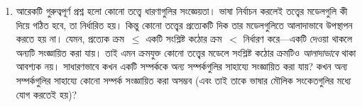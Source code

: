 \documentclass[../../../include/open-logic-section]{subfiles}
\begin{document}
\begin{explain}
\begin{enumerate}
  স্বতঃসিদ্ধ অন্যগুলির ফলশ্রুতি হয়ে অপ্রয়োজনীয় হতে পারে।
  $\Gamma$-র স্বতঃসিদ্ধ~$!A$ যে অপ্রয়োজনীয়, তা
  $\Gamma \setminus \{!A\} \Entails !A$ প্রমাণ করে দেখাতে পারি। আবার
  $(\Gamma \setminus \{!A\}) \cup \{\lnot !A\}$ পরিতৃপ্তিযোগ্য দেখিয়ে
  প্রমাণ করতে পারি যে, স্বতঃসিদ্ধটি অপ্রয়োজনীয় নয়। যেমন, এইভাবেই
  দেখানো হয়েছিল যে জ্যামিতির অন্য স্বতঃসিদ্ধগুলি থেকে সমান্তরাল
  স্বীকার্যটি স্বাধীন।
\item আরেকটি গুরুত্বপূর্ণ প্রশ্ন হলো কোনো তত্ত্বে ধারণাগুলির
  সংজ্ঞেয়তা। ভাষা নির্বাচন করলেই তত্ত্বের মডেলগুলি কী দিয়ে গঠিত হবে,
  তা নির্ধারিত হয়। কিন্তু কোনো তত্ত্বের প্রত্যেকটি দিক তার মডেলগুলিতে
  আলাদাভাবে উপস্থাপন করতে হয় না। যেমন, প্রত্যেক ক্রম~$\le$ একটি
  সংশ্লিষ্ট কঠোর ক্রম~$<$ নির্ধারণ করে—একটি দেওয়া থাকলে অন্যটি
  সংজ্ঞায়িত করা যায়। তাই এমন ক্রমযুক্ত কোনো তত্ত্বের মডেলে সংশ্লিষ্ট
  কঠোর ক্রমটিও \emph{আলাদাভাবে} থাকা আবশ্যক নয়। সাধারণভাবে কখন একটি
  সম্পর্ককে অন্য সম্পর্কগুলির সাহায্যে সংজ্ঞায়িত করা যায়? কখন অন্য
  সম্পর্কগুলির সাহায্যে কোনো সম্পর্ক সংজ্ঞায়িত করা অসম্ভব (এবং তাই
  তাকে ভাষার মৌলিক সংকেতগুলির মধ্যে যোগ করতেই হয়)?
\end{enumerate}
\end{explain}
\end{document}
